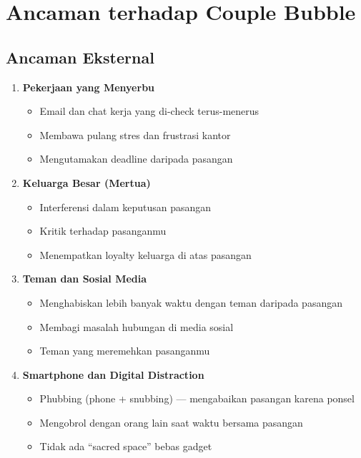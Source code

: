 \section{Ancaman terhadap Couple Bubble}

\subsection{Ancaman Eksternal}

\begin{warningbox}
\begin{enumerate}
    \item \textbf{Pekerjaan yang Menyerbu}
    \begin{itemize}
        \item Email dan chat kerja yang di-check terus-menerus
        \item Membawa pulang stres dan frustrasi kantor
        \item Mengutamakan deadline daripada pasangan
    \end{itemize}
    
    \item \textbf{Keluarga Besar (Mertua)}
    \begin{itemize}
        \item Interferensi dalam keputusan pasangan
        \item Kritik terhadap pasanganmu
        \item Menempatkan loyalty keluarga di atas pasangan
    \end{itemize}
    
    \item \textbf{Teman dan Sosial Media}
    \begin{itemize}
        \item Menghabiskan lebih banyak waktu dengan teman daripada pasangan
        \item Membagi masalah hubungan di media sosial
        \item Teman yang meremehkan pasanganmu
    \end{itemize}
    
    \item \textbf{Smartphone dan Digital Distraction}
    \begin{itemize}
        \item Phubbing (phone + snubbing) --- mengabaikan pasangan karena ponsel
        \item Mengobrol dengan orang lain saat waktu bersama pasangan
        \item Tidak ada ``sacred space'' bebas gadget
    \end{itemize}
\end{enumerate}
\end{warningbox}

